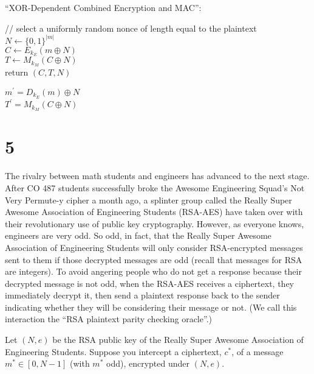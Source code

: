 \documentclass[11pt]{article}
\begin{document}
“XOR-Dependent Combined Encryption and MAC”:

\begin{algorithm}
    \caption{$AETHER(k = (k_E, k_M), m)$}
    // select a uniformly random nonce of length equal to the plaintext \\
    $N \leftarrow \{0, 1\}^{|m|}$ \\
    $C \leftarrow E_{k_E}(m \oplus N)$ \\
    $T \leftarrow M_{k_M}(C \oplus N)$ \\
    return $(C, T, N)$
\end{algorithm}

\begin{algorithm}
    \caption{$AETHER_{dec}((k_E, k_M), C, T, N)$}
    $m^\prime = D_{k_E}(m) \oplus N$ \\
    $T^\prime = M_{k_M}(C \oplus N)$ \\
     
\end{algorithm}


\newpage

\section{5}

The rivalry between math students and engineers has advanced to the next stage. After CO 487 students successfully broke the Awesome Engineering Squad's Not Very Permute-y cipher a month ago, a splinter group called the Really Super Awesome Association of Engineering Students (RSA-AES) have taken over with their revolutionary use of public key cryptography. However, as everyone knows, engineers are very odd. So odd, in fact, that the Really Super Awesome Association of Engineering Students will only consider RSA-encrypted messages sent to them if those decrypted messages are odd (recall that messages for RSA are integers). To avoid angering people who do not get a response because their decrypted message is not odd, when the RSA-AES receives a ciphertext, they immediately decrypt it, then send a plaintext response back to the sender indicating whether they will be considering their message or not. (We call this interaction the “RSA plaintext parity checking oracle”.)

Let $(N, e)$ be the RSA public key of the Really Super Awesome Association of Engineering Students.
Suppose you intercept a ciphertext, $c^*$, of a message $m^* \in [0, N-1]$ (with $m^*$ odd), encrypted
under $(N, e)$.
\end{document}
